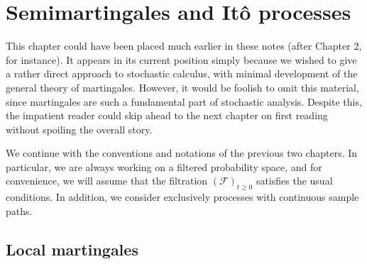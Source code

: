 \section{Semimartingales and It\^{o} processes}

This chapter could have been placed much earlier in these notes (after Chapter 2, for instance). It appears in its current position simply because we wished to give a rather direct approach to stochastic calculus, with minimal development of the general theory of martingales. However, it would be foolish to omit this material, since martingales are such a fundamental part of stochastic analysis. Despite this, the impatient reader could skip ahead to the next chapter on first reading without spoiling the overall story.

We continue with the conventions and notations of the previous two chapters. In particular, we are always working on a filtered probability space, and for convenience, we will assume that the filtration $(\mathcal{F})_{t\ge 0}$ satisfies the usual conditions. In addition, we consider exclusively processes with continuous sample paths.

\subsection{Local martingales}